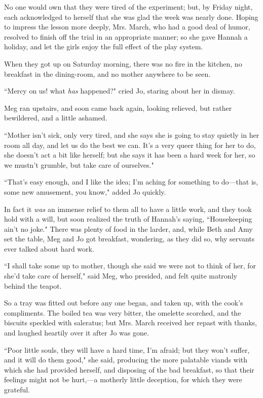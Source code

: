 No one would own that they were tired of the experiment; but, by Friday
night, each acknowledged to herself that she was glad the week was
nearly done. Hoping to impress the lesson more deeply, Mrs. March, who
had a good deal of humor, resolved to finish off the trial in an
appropriate manner; so she gave Hannah a holiday, and let the girls
enjoy the full effect of the play system.

When they got up on Saturday morning, there was no fire in the kitchen,
no breakfast in the dining-room, and no mother anywhere to be seen.

``Mercy on us! what \emph{has} happened?" cried Jo, staring about her in
dismay.

Meg ran upstairs, and soon came back again, looking relieved, but rather
bewildered, and a little ashamed.

``Mother isn't sick, only very tired, and she says she is
going to stay quietly in her room all day, and let us do the best we
can. It's a very queer thing for her to do, she
doesn't act a bit like herself; but she says it has been
a hard week for her, so we mustn't grumble, but take
care of ourselves."

``That's easy enough, and I like the idea;
I'm aching for something to do---that is, some new
amusement, you know," added Jo quickly.

In fact it \emph{was} an immense relief to them all to have a little
work, and they took hold with a will, but soon realized the truth of
Hannah's saying, ``Housekeeping ain't no
joke." There was plenty of food in the larder, and, while Beth and Amy
set the table, Meg and Jo got breakfast, wondering, as they did so, why
servants ever talked about hard work.

``I shall take some up to mother, though she said we were not to think of
her, for she'd take care of herself," said Meg, who
presided, and felt quite matronly behind the teapot.

So a tray was fitted out before any one began, and taken up, with the
cook's compliments. The boiled tea was very bitter, the
omelette scorched, and the biscuits speckled with saleratus; but Mrs.
March received her repast with thanks, and laughed heartily over it
after Jo was gone.

``Poor little souls, they will have a hard time, I'm
afraid; but they won't suffer, and it will do them
good," she said, producing the more palatable viands with which she had
provided herself, and disposing of the bad breakfast, so that their
feelings might not be hurt,---a motherly little deception, for which
they were grateful.

